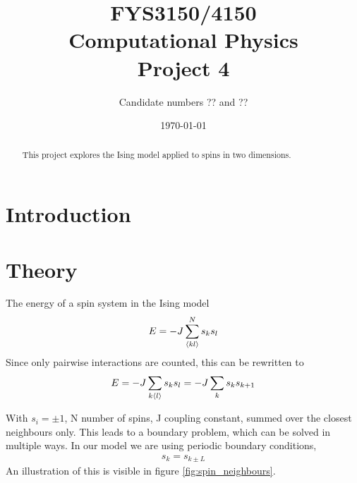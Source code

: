 \documentclass[11pt,a4paper,english]{article}
\title{FYS3150/4150\\Computational Physics\\Project 4}
\author{Candidate numbers ?? and ??}
\date{\today}
\numberwithin{equation}{section}
\begin{document}
\maketitle

\begin{abstract}
This project explores the Ising model applied to spins in two dimensions.
\end{abstract}



\section{Introduction}


\section{Theory}

The energy of a spin system in the Ising model 
\begin{gather}
E = -J\sum_{\expval{kl}}^N s_k s_l
\end{gather}
Since only pairwise interactions are counted, this can be rewritten to
\begin{gather}
E = -J\sum_{k\expval{l}} s_k s_l = -J \sum_{k} s_k s_{k+1}
\end{gather}



With $s_i = \pm 1$, N number of spins, J coupling constant, summed over 
the closest neighbours only. This leads to a boundary problem, which 
can be solved in multiple ways. In our model we are 
using periodic boundary conditions,
\begin{gather}
s_k = s_{k \pm L}
\label{eq:boundary}
\end{gather}
An illustration of this is visible in figure \ref{fig:spin_neighbours}.
\end{document}

